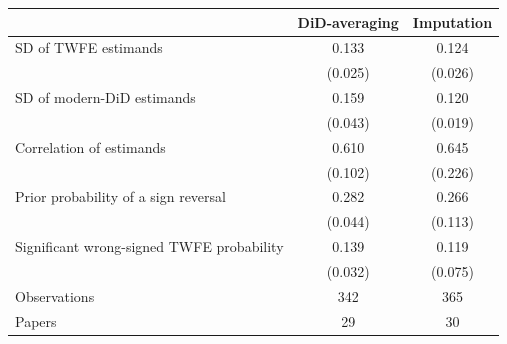 \begin{tabular}{lcc}
\toprule
 & DiD-averaging & Imputation \\
\midrule
SD of TWFE estimands & 0.133 & 0.124 \\
 & (0.025) & (0.026) \\
SD of modern-DiD estimands & 0.159 & 0.120 \\
 & (0.043) & (0.019) \\
Correlation of estimands & 0.610 & 0.645 \\
 & (0.102) & (0.226) \\
Prior probability of a sign reversal & 0.282 & 0.266 \\
 & (0.044) & (0.113) \\
Significant wrong-signed TWFE probability & 0.139 & 0.119 \\
 & (0.032) & (0.075) \\
\midrule
Observations & 342 & 365 \\
Papers & 29 & 30 \\
\bottomrule
\end{tabular}
